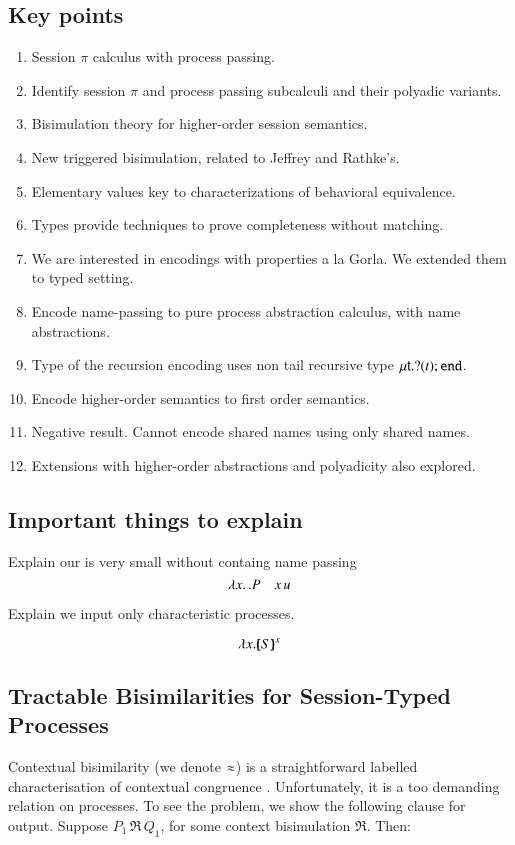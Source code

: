 \subsection{Key points}
\begin{enumerate}[1.]
	\item	Session $\pi$ calculus with process passing.
	\item	Identify session $\pi$ and process passing subcalculi and their polyadic variants.
	\item	Bisimulation theory for higher-order session semantics.
	\item	New triggered bisimulation, related to Jeffrey and Rathke's.
	\item   Elementary values key to characterizations of behavioral equivalence.
	\item	Types provide techniques to prove completeness without matching.
	\item	We are interested in encodings with properties a la Gorla. 
                We extended them to typed setting. 
	\item	Encode name-passing to pure process abstraction calculus, with name abstractions.
	\item	Type of the recursion encoding uses non tail recursive type $\mu\mathsf{t}.? (t) ; \mathtt{end}$.
	\item	Encode higher-order semantics to first order semantics.
	\item	Negative result. Cannot encode shared names using only shared names.
	\item   Extensions with higher-order abstractions and polyadicity also explored.
\end{enumerate}

\smallskip 

\subsection{Important things to explain}
Explain our \HO is very small without containg name passing 
\[ 
\lambda x.\,.P \quad x\, {u}
\]

Explain we input only characteristic processes.  

\[
\lambda x.[\!\!(S)\!\!]^{x}
\]

\subsection{Tractable Bisimilarities for Session-Typed Processes}
\noi 
{}
Contextual bisimilarity (we denote $\approx$) is 
a straightforward labelled characterisation of contextual congruence 
\cite{SaWabook}. 
Unfortunately, it is a too demanding relation on processes. 
To see the problem, we show 
the following clause for output.
Suppose $P_1 \,\Re\, Q_1$, for some context bisimulation $\Re$. Then:

